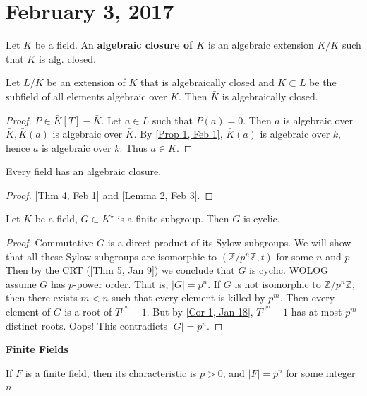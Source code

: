 \section{February 3, 2017}

\begin{defn} \label{Defn 1, Feb 3}
Let $K$ be a field. An \textbf{algebraic closure of $K$} is an algebraic extension $\bar{K}/K$ such that $\bar{K}$ is alg. closed.
\end{defn}
\begin{lemma} \label{Lemma 2, Feb 3}
Let $L/K$ be an extension of $K$ that is algebraically closed and $\bar{K}\subset L$ be the subfield of all elements algebraic over $K$. Then $\bar{K}$ is algebraically closed.
\end{lemma}
\begin{proof}
$P\in \bar{K}[T]-\bar{K}.$ Let $a\in L$ such that $P(a)=0$. Then $a$ is algebraic over $\bar{K},\bar{K}(a)$ is algebraic over $\bar{K}$. By \ref{Prop 1, Feb 1}, $\bar{K}(a)$ is algebraic over $k$, hence $a$ is algebraic over $k$. Thus $a\in\bar{K}$.
\end{proof}
\begin{cor} \label{Cor 3, Feb 3}
Every field has an algebraic closure.
\end{cor}
\begin{proof}
\ref{Thm 4, Feb 1} and \ref{Lemma 2, Feb 3}.
\end{proof}
\begin{prop} \label{Prop 4, Feb 3}
Let $K$ be a field, $G\subset K^{\star}$ is a finite subgroup. Then $G$ is cyclic.
\end{prop}
\begin{proof}
Commutative $G$ is a direct product of its Sylow subgroups. We will show that all these Sylow subgroups are isomorphic to $(\mathbb{Z}/p^n\mathbb{Z},t)$ for some $n$ and $p$. Then by the CRT (\ref{Thm 5, Jan 9}) we conclude that $G$ is cyclic. WOLOG assume $G$ has $p$-power order. That is, $|G|=p^n$. If $G$ is not isomorphic to $\mathbb{Z}/p^n\mathbb{Z}$, then there exists $m<n$ such that every element is killed by $p^m$. Then every element of $G$ is a root of $T^{p^m}-1$. But by \ref{Cor 1, Jan 18}, $T^{p^m}-1$ has at most $p^m$ distinct roots. Oops! This contradicts $|G|=p^n$.
\end{proof}
\noindent \textbf{Finite Fields}
\begin{fact} \label{Fact 5, Feb 3}
If $F$ is a finite field, then its characteristic is $p>0$, and $|F|=p^n$ for some integer $n$.
\end{fact}
